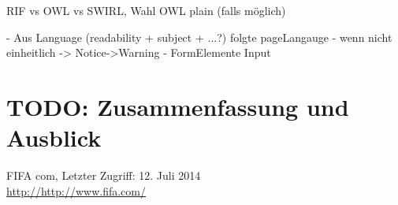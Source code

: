 \documentclass[runningheads,a4paper]{llncs}
\begin{document}
RIF vs OWL vs SWIRL, Wahl OWL plain (falls möglich)

- Aus Language (readability + subject + ...?) folgte pageLangauge
- wenn nicht einheitlich -> Notice->Warning
- FormElemente Input

\newpage
\section{TODO: Zusammenfassung und Ausblick}




\begin{thebibliography}{4}

FIFA com,
Letzter Zugriff: 12. Juli 2014\\
\url{http://http://www.fifa.com/}

\end{thebibliography}
\end{document}
